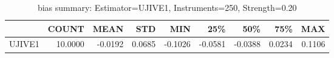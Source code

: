 \begin{table}[ht]
\centering
\caption{bias summary: Estimator=UJIVE1, Instruments=250, Strength=0.20}
\begin{tabular}{lrrrrrrrr}
\toprule
 & COUNT & MEAN & STD & MIN & 25\% & 50\% & 75\% & MAX \\
\midrule
UJIVE1 & 10.0000 & -0.0192 & 0.0685 & -0.1026 & -0.0581 & -0.0388 & 0.0234 & 0.1106 \\
\bottomrule
\end{tabular}
\end{table}
